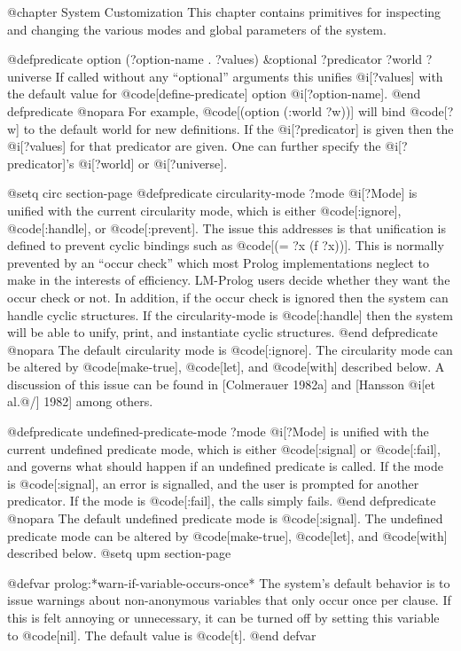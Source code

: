{@chapter System Customization
This chapter contains primitives for inspecting and changing the various modes
and global parameters of the system.

@defpredicate option (?option-name . ?values) &optional ?predicator ?world ?universe
If called without any ``optional'' arguments 
this unifies @i[?values]
with the default value for @code[define-predicate] option
@i[?option-name].
@end defpredicate
@nopara
For example, @code[(option (:world ?w))] will bind @code[?w]
to the default world for new definitions.
If the @i[?predicator] is given then the @i[?values]
for that predicator are given.
One can further specify the @i[?predicator]'s @i[?world] or
@i[?universe].

@setq circ section-page
@defpredicate circularity-mode ?mode
@i[?Mode] is unified with the current circularity mode, which is either
@code[:ignore], @code[:handle], or @code[:prevent].
The issue this addresses is that unification is defined to prevent cyclic
bindings such as @code[(= ?x (f ?x))].
This is normally prevented by an ``occur check'' which most Prolog
implementations neglect to make in the interests of efficiency.
LM-Prolog users decide whether they want the occur check or not.
In addition, if the occur check is ignored then the system can handle
cyclic structures.
If the circularity-mode is @code[:handle] then the system will be able to unify,
print, and instantiate cyclic structures.
@end defpredicate
@nopara
The default circularity mode is @code[:ignore].  The circularity mode can
be altered by @code[make-true], @code[let], and @code[with] described below.
A discussion of this issue can be found in [Colmerauer 1982a] and
[Hansson @i[et al.@/] 1982] among others.

@defpredicate undefined-predicate-mode ?mode
@i[?Mode] is unified with the current undefined predicate mode, 
which is either @code[:signal] or @code[:fail], and governs what should
happen if an undefined predicate is called.  If the mode is @code[:signal],
an error is signalled, and the user is prompted for another predicator.
If the mode is @code[:fail], the calls simply fails.
@end defpredicate
@nopara
The default undefined predicate mode is @code[:signal].  The
undefined predicate mode can be altered by @code[make-true], @code[let], and
@code[with] described below.
@setq upm section-page

@defvar prolog:*warn-if-variable-occurs-once*
The system's default behavior is to issue warnings about
non-anonymous variables that only occur once per clause.
If this is felt annoying or unnecessary, it can be turned off
by setting this variable to @code[nil].  The default value is @code[t].
@end defvar


}
